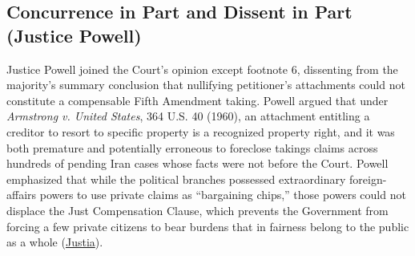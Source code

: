 \documentclass[12pt]{article}
\begin{document}
\subsection{Concurrence in Part and Dissent in Part (Justice Powell)}
Justice Powell joined the Court's opinion except footnote 6, dissenting from the majority's summary conclusion that nullifying petitioner's attachments could not constitute a compensable Fifth Amendment taking. Powell argued that under \textit{Armstrong v. United States}, 364 U.S. 40 (1960), an attachment entitling a creditor to resort to specific property is a recognized property right, and it was both premature and potentially erroneous to foreclose takings claims across hundreds of pending Iran cases whose facts were not before the Court. Powell emphasized that while the political branches possessed extraordinary foreign-affairs powers to use private claims as ``bargaining chips,'' those powers could not displace the Just Compensation Clause, which prevents the Government from forcing a few private citizens to bear burdens that in fairness belong to the public as a whole (\href{https://supreme.justia.com/cases/federal/us/453/654/}{Justia}).
\end{document}
